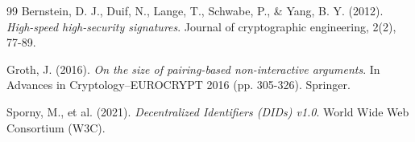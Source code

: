 \vspace{1cm}
\begin{thebibliography}{99}
Bernstein, D. J., Duif, N., Lange, T., Schwabe, P., \& Yang, B. Y. (2012). \textit{High-speed high-security signatures}. Journal of cryptographic engineering, 2(2), 77-89.

Groth, J. (2016). \textit{On the size of pairing-based non-interactive arguments}. In Advances in Cryptology–EUROCRYPT 2016 (pp. 305-326). Springer.

Sporny, M., et al. (2021). \textit{Decentralized Identifiers (DIDs) v1.0}. World Wide Web Consortium (W3C).
\end{thebibliography}
